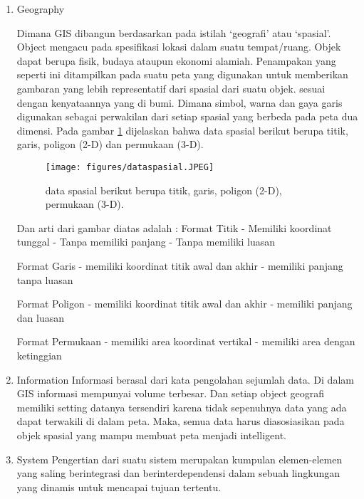 \begin{enumerate}
\item Geography

Dimana GIS dibangun berdasarkan pada istilah ‘geografi’ atau ‘spasial’.
Object mengacu pada spesifikasi lokasi dalam suatu tempat/ruang. Objek dapat berupa fisik,
budaya ataupun ekonomi alamiah. Penampakan yang seperti ini ditampilkan pada suatu peta yang 
digunakan untuk memberikan gambaran yang lebih representatif dari spasial dari suatu objek.
sesuai dengan kenyataannya yang di bumi. Dimana simbol, warna dan gaya garis digunakan sebagai
perwakilan dari setiap spasial yang berbeda pada peta dua dimensi.
Pada gambar \ref{data spasial} dijelaskan bahwa data spasial berikut berupa 
titik, garis, poligon (2-D) dan permukaan (3-D).

\begin{figure}[ht]
	\centerline{\texttt{[image: figures/dataspasial.JPEG]}}
	\caption{data spasial berikut berupa titik, garis, poligon (2-D), permukaan (3-D).}
	\label{data spasial}
	\end{figure}

Dan arti dari gambar diatas adalah :
Format Titik 						
- Memiliki koordinat tunggal 		
- Tanpa memiliki panjang 			
- Tanpa memiliki luasan

Format Garis
- memiliki koordinat titik awal dan akhir		
- memiliki panjang tanpa luasan

Format Poligon 					
- memiliki koordinat titik awal dan akhir
- memiliki panjang dan luasan 		

Format Permukaan
- memiliki area koordinat vertikal
- memiliki area dengan ketinggian

\item Information
Informasi berasal dari kata pengolahan sejumlah data. Di dalam GIS informasi mempunyai
volume terbesar. Dan setiap object geografi memiliki setting datanya tersendiri karena 
tidak sepenuhnya data yang ada dapat terwakili di dalam peta. Maka, semua data harus
diasosiasikan pada objek spasial yang mampu membuat peta menjadi intelligent.

\item System
Pengertian dari suatu sistem merupakan kumpulan elemen-elemen yang saling berintegrasi 
dan berinterdependensi dalam sebuah lingkungan yang dinamis untuk mencapai tujuan tertentu.
\end{enumerate}


